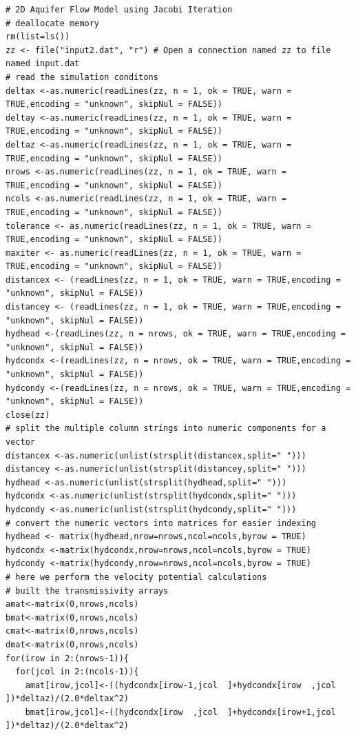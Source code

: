 \begin{lstlisting}[caption= 2D Steady Confined Aquifer Flow Script , label=lst:2DinclusionHead]
# 2D Aquifer Flow Model using Jacobi Iteration
# deallocate memory
rm(list=ls())
zz <- file("input2.dat", "r") # Open a connection named zz to file named input.dat
# read the simulation conditons
deltax <-as.numeric(readLines(zz, n = 1, ok = TRUE, warn = TRUE,encoding = "unknown", skipNul = FALSE))
deltay <-as.numeric(readLines(zz, n = 1, ok = TRUE, warn = TRUE,encoding = "unknown", skipNul = FALSE))
deltaz <-as.numeric(readLines(zz, n = 1, ok = TRUE, warn = TRUE,encoding = "unknown", skipNul = FALSE))
nrows <-as.numeric(readLines(zz, n = 1, ok = TRUE, warn = TRUE,encoding = "unknown", skipNul = FALSE))
ncols <-as.numeric(readLines(zz, n = 1, ok = TRUE, warn = TRUE,encoding = "unknown", skipNul = FALSE))
tolerance <- as.numeric(readLines(zz, n = 1, ok = TRUE, warn = TRUE,encoding = "unknown", skipNul = FALSE))
maxiter <- as.numeric(readLines(zz, n = 1, ok = TRUE, warn = TRUE,encoding = "unknown", skipNul = FALSE))
distancex <- (readLines(zz, n = 1, ok = TRUE, warn = TRUE,encoding = "unknown", skipNul = FALSE))
distancey <- (readLines(zz, n = 1, ok = TRUE, warn = TRUE,encoding = "unknown", skipNul = FALSE))
hydhead <-(readLines(zz, n = nrows, ok = TRUE, warn = TRUE,encoding = "unknown", skipNul = FALSE))
hydcondx <-(readLines(zz, n = nrows, ok = TRUE, warn = TRUE,encoding = "unknown", skipNul = FALSE))
hydcondy <-(readLines(zz, n = nrows, ok = TRUE, warn = TRUE,encoding = "unknown", skipNul = FALSE))
close(zz)
# split the multiple column strings into numeric components for a vector
distancex <-as.numeric(unlist(strsplit(distancex,split=" ")))
distancey <-as.numeric(unlist(strsplit(distancey,split=" ")))
hydhead <-as.numeric(unlist(strsplit(hydhead,split=" ")))
hydcondx <-as.numeric(unlist(strsplit(hydcondx,split=" ")))
hydcondy <-as.numeric(unlist(strsplit(hydcondy,split=" ")))
# convert the numeric vectors into matrices for easier indexing
hydhead <- matrix(hydhead,nrow=nrows,ncol=ncols,byrow = TRUE)
hydcondx <-matrix(hydcondx,nrow=nrows,ncol=ncols,byrow = TRUE)
hydcondy <-matrix(hydcondy,nrow=nrows,ncol=ncols,byrow = TRUE)
# here we perform the velocity potential calculations
# built the transmissivity arrays
amat<-matrix(0,nrows,ncols) 
bmat<-matrix(0,nrows,ncols) 
cmat<-matrix(0,nrows,ncols)
dmat<-matrix(0,nrows,ncols)
for(irow in 2:(nrows-1)){
  for(jcol in 2:(ncols-1)){
    amat[irow,jcol]<-((hydcondx[irow-1,jcol  ]+hydcondx[irow  ,jcol  ])*deltaz)/(2.0*deltax^2)
    bmat[irow,jcol]<-((hydcondx[irow  ,jcol  ]+hydcondx[irow+1,jcol  ])*deltaz)/(2.0*deltax^2)

\end{lstlisting}

